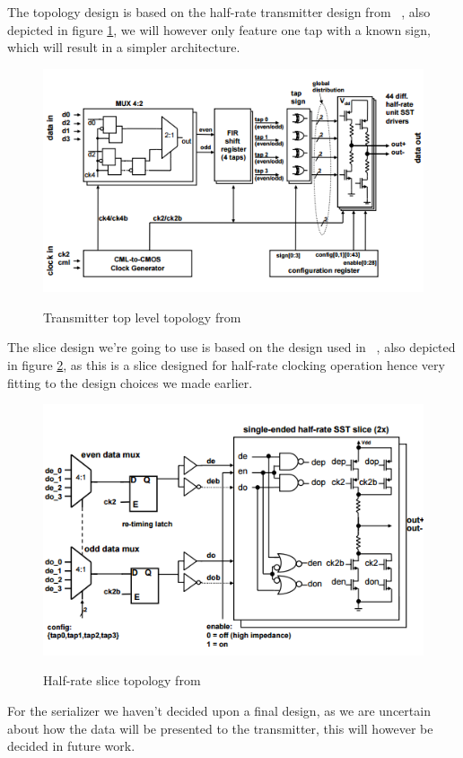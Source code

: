 The topology design is based on the half-rate transmitter design from ~\cite{menolfi2007a}, also depicted in figure \ref{fig:topology1}, we will however only feature one tap with a known sign, which will result in a simpler architecture.

\begin{figure}[H]
  \centering
  {\includegraphics[scale=0.55]{img/topology_tx1.png}}
  \caption{Transmitter top level topology from ~\cite{menolfi2007a}}
  \label{fig:topology1}
\end{figure}


The slice design we're going to use is based on the design used in ~\cite{menolfi2007a}, also depicted in figure \ref{fig:topology0}, as this is a slice designed for half-rate clocking operation hence very fitting to the design choices we made earlier.

\begin{figure}[H]
  \centering
  {\includegraphics[scale=0.55]{img/topology_tx0.png}}
  \caption{Half-rate slice topology from ~\cite{menolfi2007a}}
  \label{fig:topology0}
\end{figure}

For the serializer we haven't decided upon a final design, as we are uncertain about how the data will be presented to the transmitter, this will however be decided in future work.